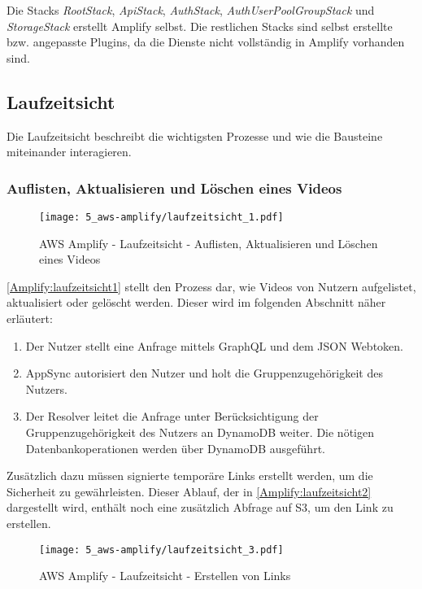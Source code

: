 Die Stacks \textit{RootStack}, \textit{ApiStack}, \textit{AuthStack}, \textit{AuthUserPoolGroupStack} und \textit{StorageStack} erstellt Amplify selbst. Die restlichen Stacks sind selbst erstellte bzw. angepasste Plugins, da die Dienste nicht vollständig in Amplify vorhanden sind.

\subsection{Laufzeitsicht}

Die Laufzeitsicht beschreibt die wichtigsten Prozesse und wie die Bausteine miteinander interagieren.

\subsubsection{Auflisten, Aktualisieren und Löschen eines Videos}

\begin{figure}
  \centering
  \texttt{[image: 5\_aws-amplify/laufzeitsicht\_1.pdf]}
  \caption{AWS Amplify - Laufzeitsicht - Auflisten, Aktualisieren und Löschen eines Videos}
  \label{Amplify:laufzeitsicht1}
\end{figure}

\autoref{Amplify:laufzeitsicht1} stellt den Prozess dar, wie Videos von Nutzern aufgelistet, aktualisiert oder gelöscht werden. Dieser wird im folgenden Abschnitt näher erläutert:
\begin{enumerate}
  \item{Der Nutzer stellt eine Anfrage mittels GraphQL und dem JSON Webtoken.}
  \item{AppSync autorisiert den Nutzer und holt die Gruppenzugehörigkeit des Nutzers.}
  \item{Der Resolver leitet die Anfrage unter Berücksichtigung der Gruppenzugehörigkeit des Nutzers an DynamoDB weiter. Die nötigen Datenbankoperationen werden über DynamoDB ausgeführt.}
\end{enumerate}

Zusätzlich dazu müssen signierte temporäre Links erstellt werden, um die Sicherheit zu gewährleisten. Dieser Ablauf, der in \autoref{Amplify:laufzeitsicht2} dargestellt wird, enthält noch eine zusätzlich Abfrage auf S3, um den Link zu erstellen.

\begin{figure}
  \centering
  \texttt{[image: 5\_aws-amplify/laufzeitsicht\_3.pdf]}
  \caption{AWS Amplify - Laufzeitsicht - Erstellen von Links}
  \label{Amplify:laufzeitsicht2}
\end{figure}

